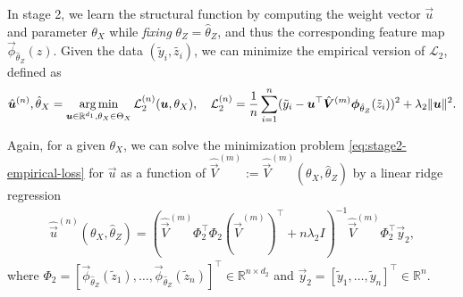 In stage 2, we learn the structural function by computing the weight vector $\vec{u}$ and parameter $\theta_X$ while \emph{fixing}  $\theta_Z=\hat{\theta}_Z$, and thus the corresponding feature map $\vec{\phi}_{\hat{\theta}_Z}(z)$. Given the data $(\tilde y_i, \tilde{z_i})$, we can minimize the empirical version of $\mathcal{L}_2$, defined as
\begin{align}
    \hat{\bm{u}}^{(n)}, \hat{\theta}_X = \operatorname*{arg\,min}_{\bm{u} \in \mathbb{R}^{d_1}, \theta_X \in \Theta_X}\mathcal{L}^{(n)}_2(\bm{u},\theta_X), \quad \mathcal{L}^{(n)}_2 = \frac1n \sum_{i=1}^n (\tilde y_i - \bm{u}^\top \hat{\bm{V}}^{(m)} \bm{\phi}_{\hat\theta_Z}(\tilde z_i))^2 + \lambda_2 \|\bm{u}\|^2. \label{eq:stage2-empirical-loss}
\end{align}

Again, for a given $\theta_X$, we can solve the minimization problem \eqref{eq:stage2-empirical-loss} for $\vec{u}$ as a function of $\hat{\vec{V}}^{(m)}:=\hat{\vec{V}}^{(m)}(\theta_X,\hat\theta_Z)$ by a linear ridge regression
\begin{align}
    \hat{\vec{u}}^{(n)}(\theta_X,\hat\theta_Z) = \left(\hat{\vec{V}}^{(m)}\Phi_2 ^\top \Phi_2 (\hat{\vec{V}}^{(m)})^\top + n\lambda_2 I\right)^{-1}\hat{\vec{V}}^{(m)}\Phi_2^\top \vec{y}_2, \label{eq:stage2-sol}
\end{align}
where
$    \Phi_2 = [\vec{\phi}_{\hat\theta_Z}(\tilde z_1), \dots, \vec{\phi}_{\hat\theta_Z}(\tilde z_n)]^\top \in \mathbb{R}^{n \times d_2}$ and $\vec{y}_2 = [\tilde y_1, \dots, \tilde y_n]^\top \in \mathbb{R}^{n}.
$ %


